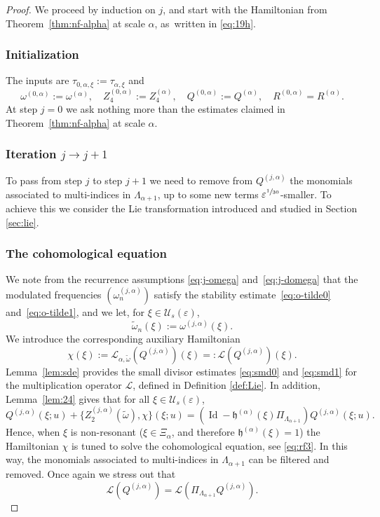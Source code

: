\documentclass[JEP,XML,SOM,Unicode,published]{cedram}
\theoremstyle{plain}
\theoremstyle{definition}
\newcommand{\1}{\mathbf{1}}
\let\epsilon\varepsilon
\begin{document}
\begin{proof} We proceed by induction on $j$, and start with the Hamiltonian from Theorem~\ref{thm:nf-alpha} at scale $\alpha$, as~written in \eqref{eq:19h}.

\subsubsection*{Initialization} The inputs are $\tau_{0,\alpha,\xi} := \tau_{\alpha,\xi}$ and
\[
\omega^{(0,\alpha)} := \omega^{(\alpha)},\quad Z_{4}^{(0,\alpha)} := Z_{4}^{(\alpha)},\quad Q^{(0,\alpha)}:=Q^{(\alpha)},\quad R^{(0,\alpha)}= R^{(\alpha)}.
\]
At step $j=0$ we ask nothing more than the estimates claimed in Theorem~\ref{thm:nf-alpha} at scale $\alpha$.

\subsubsection*{Iteration $j\to j+1$}
To pass from step $j$ to step $j+1$ we need to remove from $Q^{(j,\alpha)}$ the monomials associated to multi-indices in $\Lambda_{\alpha+1}$, up to some new terms $\epsilon^{\sfrac{1}{30}}$\nobreakdash-smaller. To achieve this we consider the Lie transformation introduced and studied in Section \ref{sec:lie}.

\subsubsection*{The cohomological equation} We note from the recurrence assumptions \eqref{eq:j-omega} and~\eqref{eq:j-domega} that the modulated frequencies $(\omega_{n}^{(j,\alpha)})$ satisfy the stability estimate~\eqref{eq:o-tilde0} and~\eqref{eq:o-tilde1}, and we let, for $\xi\in\mathcal{U}_{s}(\epsilon)$,
\[
\widetilde{\omega}_{n}(\xi) := \omega^{(j,\alpha)}(\xi).
\]
We introduce the corresponding auxiliary Hamiltonian
\begin{equation}
\label{eq:coho}
\chi(\xi)
:= \mathcal{L}_{\alpha,\widetilde{\omega}}(Q^{(j,\alpha)})(\xi)
=: \mathcal{L}(Q^{(j,\alpha)})(\xi).
\end{equation}
Lemma~\ref{lem:sde} provides the small divisor estimates \eqref{eq:smd0} and \eqref{eq:smd1} for the multiplication operator $\mathcal{L}$, defined in Definition \ref{def:Lie}. In addition, Lemma~\ref{lem:24} gives that for all $\xi\in\mathcal{U}_{s}(\epsilon)$,
\begin{equation}
\label{eq:cohoQ}
Q^{(j,\alpha)}(\xi;u)
+
\{Z_{2}^{(j,\alpha)}(\widetilde{\omega}),\chi\}(\xi;u)
=(\operatorname{Id}-\mathfrak{h}^{(\alpha)}(\xi)\Pi_{\Lambda_{\alpha+1}})Q^{(j,\alpha)}(\xi;u).
\end{equation}
Hence, when $\xi$ is non-resonant (\ie $\xi\in\Xi_{\alpha}$, and therefore $\mathfrak{h}^{(\alpha)}(\xi)=1$) the Hamiltonian $\chi$ is tuned to solve the cohomological equation, see \eqref{eq:rf3}.
In this way, the monomials associated to multi-indices in $\Lambda_{\alpha+1}$ can be filtered and removed. Once again we stress out that
\[
\mathcal{L}(Q^{(j,\alpha)})
=
\mathcal{L}(\Pi_{\Lambda_{\alpha+1}}Q^{(j,\alpha)}).
\]


\end{proof}
\end{document}

